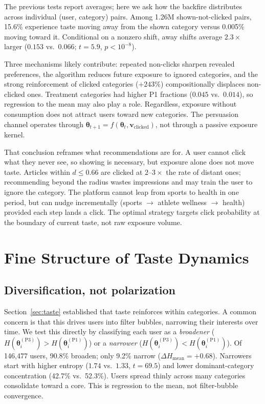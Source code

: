 \documentclass[11pt]{article}
\begin{document}
The previous tests report averages; here we ask how the backfire distributes across individual (user, category) pairs. Among 1.26M shown-not-clicked pairs, 15.6\% experience taste moving away from the shown category versus 0.005\% moving toward it. Conditional on a nonzero shift, away shifts average $2.3\times$ larger ($0.153$ vs.\ $0.066$; $t = 5.9$, $p < 10^{-8}$).

Three mechanisms likely contribute: repeated non-clicks sharpen revealed preferences, the algorithm reduces future exposure to ignored categories, and the strong reinforcement of clicked categories ($+243\%$) compositionally displaces non-clicked ones. Treatment categories had higher P1 fractions ($0.045$ vs.\ $0.014$), so regression to the mean may also play a role. Regardless, exposure without consumption does not attract users toward new categories. The persuasion channel operates through $\boldsymbol{\theta}_{t+1} = f(\boldsymbol{\theta}_t, \mathbf{v}_{\text{clicked}})$, not through a passive exposure kernel.

That conclusion reframes what recommendations are for. A user cannot click what they never see, so showing is necessary, but exposure alone does not move taste. Articles within $d \leq 0.66$ are clicked at $2$--$3\times$ the rate of distant ones; recommending beyond the radius wastes impressions and may train the user to ignore the category. The platform cannot leap from sports to health in one period, but can nudge incrementally (sports $\to$ athlete wellness $\to$ health) provided each step lands a click. The optimal strategy targets click probability at the boundary of current taste, not raw exposure volume.


\section{Fine Structure of Taste Dynamics}
\label{sec:fine}

\subsection{Diversification, not polarization}

Section~\ref{sec:taste} established that taste reinforces within categories. A common concern is that this drives users into filter bubbles, narrowing their interests over time. We test this directly by classifying each user as a \emph{broadener} ($H(\boldsymbol{\theta}_i^{(\text{P3})}) > H(\boldsymbol{\theta}_i^{(\text{P1})})$) or a \emph{narrower} ($H(\boldsymbol{\theta}_i^{(\text{P3})}) < H(\boldsymbol{\theta}_i^{(\text{P1})})$). Of 146,477 users, 90.8\% broaden; only 9.2\% narrow ($\Delta H_{\text{mean}} = +0.68$). Narrowers start with higher entropy ($1.74$ vs.\ $1.33$, $t = 69.5$) and lower dominant-category concentration (42.7\% vs.\ 52.3\%). Users spread thinly across many categories consolidate toward a core. This is regression to the mean, not filter-bubble convergence.
\end{document}
